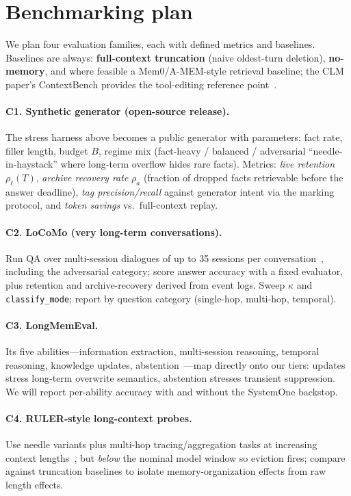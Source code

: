 \documentclass[10pt]{article}
\begin{document}
\section{Benchmarking plan}
We plan four evaluation families, each with defined metrics and baselines. Baselines are always: \textbf{full-context truncation} (naive oldest-turn deletion), \textbf{no-memory}, and where feasible a Mem0/A-MEM-style retrieval baseline; the CLM paper's ContextBench provides the tool-editing reference point~\cite{clm}.

\paragraph{C1. Synthetic generator (open-source release).}
The stress harness above becomes a public generator with parameters: fact rate, filler length, budget $B$, regime mix (fact-heavy / balanced / adversarial ``needle-in-haystack'' where long-term overflow hides rare facts). Metrics: \emph{live retention} $\rho_\ell(T)$, \emph{archive recovery rate} $\rho_a$ (fraction of dropped facts retrievable before the answer deadline), \emph{tag precision/recall} against generator intent via the marking protocol, and \emph{token savings} vs.\ full-context replay.

\paragraph{C2. LoCoMo (very long-term conversations).}
Run QA over multi-session dialogues of up to 35 sessions per conversation~\cite{locomo}, including the adversarial category; score answer accuracy with a fixed evaluator, plus retention and archive-recovery derived from event logs. Sweep $\kappa$ and \texttt{classify\_mode}; report by question category (single-hop, multi-hop, temporal).

\paragraph{C3. LongMemEval.}
Its five abilities---information extraction, multi-session reasoning, temporal reasoning, knowledge updates, abstention~\cite{longmemeval}---map directly onto our tiers: updates stress long-term overwrite semantics, abstention stresses transient suppression. We will report per-ability accuracy with and without the SystemOne backstop.

\paragraph{C4. RULER-style long-context probes.}
Use needle variants plus multi-hop tracing/aggregation tasks at increasing context lengths~\cite{ruler}, but \emph{below} the nominal model window so eviction fires; compare against truncation baselines to isolate memory-organization effects from raw length effects.
\end{document}
